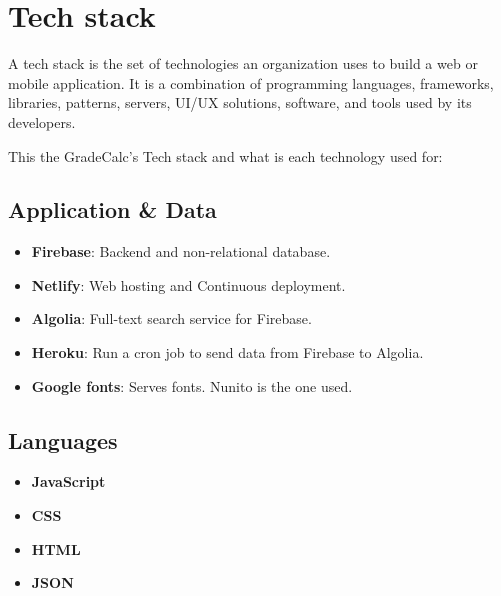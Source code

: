 \section{Tech stack}
\label{sec:stack}

A tech stack is the set of technologies an organization uses to build a web or mobile application. It is a combination of programming languages, frameworks, libraries, patterns, servers, UI/UX solutions, software, and tools used by its developers.\cite{tech-stack}

This the GradeCalc's Tech stack and what is each technology used for:

\subsection*{Application \& Data}
\begin{itemize}[noitemsep,topsep=0pt]
    \item \textbf{Firebase}: Backend and non-relational database.
    \item \textbf{Netlify}: Web hosting and Continuous deployment.
    \item \textbf{Algolia}: Full-text search service for Firebase.
    \item \textbf{Heroku}: Run a cron job to send data from Firebase to Algolia.
    \item \textbf{Google fonts}: Serves fonts. Nunito \cite{nunito} is the one used.
\end{itemize}

\vspace{-5mm}
\subsection*{Languages}
\begin{multicols}{4}
\begin{itemize}[noitemsep,topsep=0pt]
    \item \textbf{JavaScript}
    \item \textbf{CSS}
    \item \textbf{HTML}
    \item \textbf{JSON}
\end{itemize}
\end{multicols}

